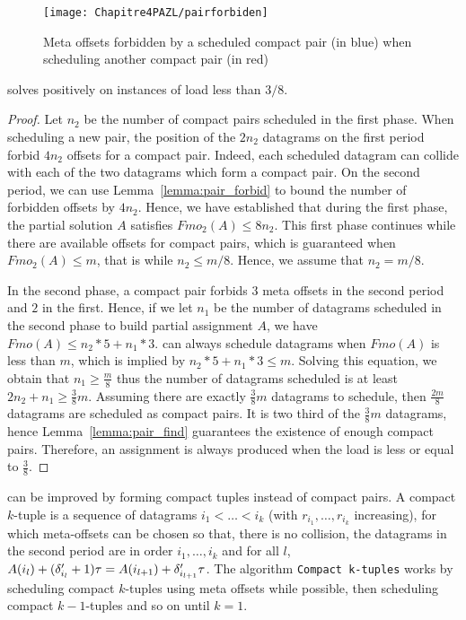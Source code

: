 \begin{figure}
\begin{center}
\texttt{[image: Chapitre4PAZL/pairforbiden]}
\end{center}

\caption{Meta offsets forbidden by a scheduled compact pair (in blue) when scheduling another compact pair (in red)} 
\label{fig:forbidenmeta}
\end{figure}
\begin{theorem}
\compactpair solves \pma positively on instances of load less than
$3/8$.
\end{theorem}
\begin{proof}
Let $n_2$ be the number of compact pairs scheduled in the first phase. When scheduling a new pair, the position of the $2n_2$ datagrams on the first period forbid $4n_2$ offsets for a compact pair. Indeed, each scheduled datagram can collide
with each of the two datagrams which form a compact pair. On the second period, we can use Lemma~\ref{lemma:pair_forbid} to bound the number of forbidden offsets by $4n_2$. 
Hence, we have established that during the first phase, the partial solution $A$
satisfies $Fmo_2(A) \leq 8n_2$. This first phase continues while there are available offsets for compact pairs, which is guaranteed when $Fmo_2(A) \leq m$, that is while $n_2 \leq m/8$. Hence, we assume that $n_2 = m/8$.

In the second phase, a compact pair forbids $3$ meta offsets in the 
second period and $2$ in the first. Hence, if we let $n_1$ be the number of datagrams scheduled in the second phase to build partial assignment $A$, we have $Fmo(A) \leq n_2*5 + n_1*3$. 
\compactpair can always schedule datagrams when $Fmo(A)$ is less than $m$, which is implied by $n_2*5 + n_1*3 \leq m$.
Solving this equation, we obtain that $n_1 \geq \frac{m}{8}$ thus the number of datagrams scheduled is at least $2n_2 + n_1 \geq \frac{3}{8}m$. Assuming there are exactly $\frac{3}{8}m$ datagrams to schedule, then $\frac{2m}{8}$ datagrams are scheduled as compact pairs. It is two third of the $\frac{3}{8}m$ datagrams, hence Lemma~\ref{lemma:pair_find} guarantees the existence of enough compact pairs. Therefore, an assignment is always produced when the load is less or equal to $\frac{3}{8}$.
\end{proof}

\compactpair can be improved by forming compact tuples instead of compact pairs.
A compact $k$-tuple is a sequence of datagrams $i_1 < \dots < i_k$ (with $r_{i_1},\dots,r_{i_k}$ increasing), for which meta-offsets can be chosen so that, there is no collision, the datagrams in the second period are in order $i_1,\dots,i_k$ and for all $l$, $A(i_l) + (\delta'_{i_l} + 1)\tau = A(i_{l+1}) + \delta'_{i_{l+1}}\tau$.
The algorithm \texttt{Compact k-tuples} works by scheduling compact $k$-tuples
using meta offsets while possible, then scheduling compact $k-1$-tuples and so on until $k=1$.


